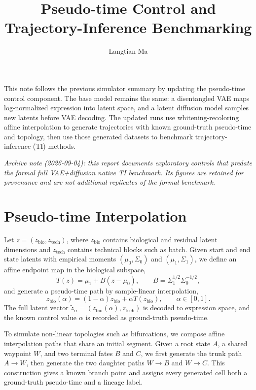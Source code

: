 \documentclass[10pt]{article}
\title{\vspace{-2.2em}Pseudo-time Control and Trajectory-Inference Benchmarking}
\author{Langtian Ma}
\date{}
\begin{document}
\maketitle
\vspace{-2.0em}

This note follows the previous simulator summary by updating the pseudo-time control component. The base model remains the same: a disentangled VAE maps log-normalized expression into latent space, and a latent diffusion model samples new latents before VAE decoding. The updated runs use whitening-recoloring affine interpolation to generate trajectories with known ground-truth pseudo-time and topology, then use those generated datasets to benchmark trajectory-inference (TI) methods.

\textit{Archive note (2026-09-04): this report documents exploratory controls
that predate the formal full VAE+diffusion native TI benchmark. Its figures are
retained for provenance and are not additional replicates of the formal
benchmark.}

\section*{Pseudo-time Interpolation}

Let \(z=(z_{\mathrm{bio}}, z_{\mathrm{tech}})\), where \(z_{\mathrm{bio}}\) contains biological and residual latent dimensions and \(z_{\mathrm{tech}}\) contains technical blocks such as batch. Given start and end state latents with empirical moments \((\mu_0,\Sigma_0)\) and \((\mu_1,\Sigma_1)\), we define an affine endpoint map in the biological subspace,
\[
T(z)=\mu_1+B(z-\mu_0),
\qquad
B=\Sigma_1^{1/2}\Sigma_0^{-1/2},
\]
and generate a pseudo-time path by sample-linear interpolation,
\[
z_{\mathrm{bio}}(\alpha)=(1-\alpha)z_{\mathrm{bio}}+\alpha T(z_{\mathrm{bio}}),
\qquad \alpha\in[0,1].
\]
The full latent vector \(\tilde z_\alpha=(z_{\mathrm{bio}}(\alpha),z_{\mathrm{tech}})\) is decoded to expression space, and the known control value \(\alpha\) is recorded as ground-truth pseudo-time.

To simulate non-linear topologies such as bifurcations, we compose affine interpolation paths that share an initial segment. Given a root state \(A\), a shared waypoint \(W\), and two terminal fates \(B\) and \(C\), we first generate the trunk path \(A \to W\), then generate the two daughter paths \(W \to B\) and \(W \to C\). This construction gives a known branch point and assigns every generated cell both a ground-truth pseudo-time and a lineage label.
\end{document}
